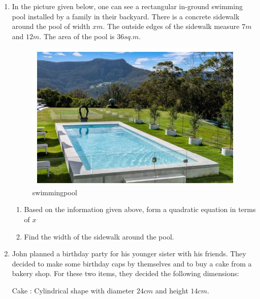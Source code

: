 \begin{enumerate}
\item In the picture given below, one can see a rectangular in-ground swimming pool installed by a family in their backyard. There is a concrete sidewalk around the pool of width $x m$. The outside edges of the sidewalk measure $7 m$ and $12 m$. The area of the pool is $36 sq. m$.
\begin{figure}[H]
    \centering
    \includegraphics[width=\columnwidth]{figs/swimmingpool7.png}
    \caption{swimmingpool}
    \label{fig:fig7}
\end{figure}
\begin{enumerate}
    \item Based on the information given above, form a quadratic equation in terms of $x$
    \item Find the width of the sidewalk around the pool.
\end{enumerate}

\item John planned a birthday party for his younger sister with his friends. They decided to make some birthday caps by themselves and to buy a cake from a bakery shop. For these two items, they decided the following dimensions:

Cake : Cylindrical shape with diameter $24 cm$ and height $14 cm.$


\end{enumerate}
